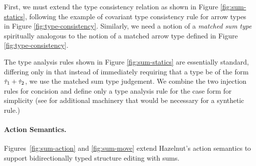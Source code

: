 First, we must extend the type consistency relation as shown in Figure \ref{fig:sum-statics}, following the example of covariant type consistency rule for arrow types in Figure \ref{fig:type-consistency}. Similarly, we need a notion of a \emph{matched sum type} spiritually analogous to the notion of a matched arrow type defined in Figure \ref{fig:type-consistency}. 

The type analysis rules shown in Figure \ref{fig:sum-statics} are essentially standard, differing only in that instead of immediately requiring that a type be of the form $\dot{\tau}_1 + \dot{\tau}_2$, we use the matched sum type judgement. We combine the two injection rules for concision and define only a type analysis rule for the case form for simplicity (see \cite{DBLP:conf/popl/CiminiS16} for additional machinery that would be necessary for a synthetic rule.)



%


\paragraph{Action Semantics.}
Figures~\ref{fig:sum-action} and \ref{fig:sum-move} extend Hazelnut's
action semantics to support bidirectionally typed structure editing with sums.
%

